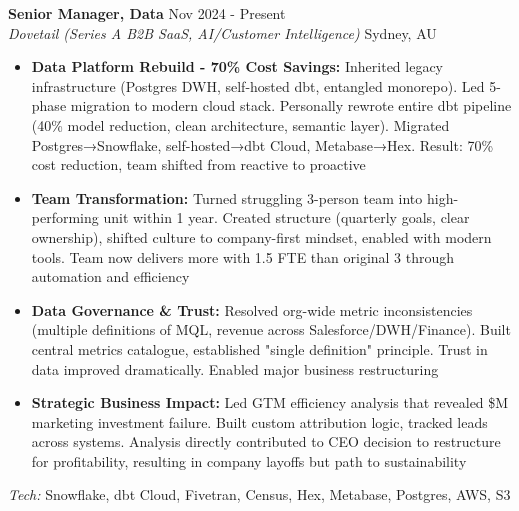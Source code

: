 \documentclass[10pt,a4paper]{article}
\newcommand{\cventry}[5]{
    \textbf{#1} \hfill {\small\color{darkgray} #2} \\
    {\color{accentcolor}\textit{#3}} \hfill {\small\color{darkgray} #4} \\
    #5
    \vspace{6pt}
}
\begin{document}
\cventry
    {Senior Manager, Data}
    {Nov 2024 - Present}
    {Dovetail (Series A B2B SaaS, AI/Customer Intelligence)}
    {Sydney, AU}
    {
    \begin{itemize}[leftmargin=*, itemsep=1pt, parsep=0pt, topsep=2pt]
        \item \textbf{Data Platform Rebuild - 70\% Cost Savings:} Inherited legacy infrastructure (Postgres DWH, self-hosted dbt, entangled monorepo). Led 5-phase migration to modern cloud stack. Personally rewrote entire dbt pipeline (40\% model reduction, clean architecture, semantic layer). Migrated Postgres→Snowflake, self-hosted→dbt Cloud, Metabase→Hex. Result: 70\% cost reduction, team shifted from reactive to proactive
        \item \textbf{Team Transformation:} Turned struggling 3-person team into high-performing unit within 1 year. Created structure (quarterly goals, clear ownership), shifted culture to company-first mindset, enabled with modern tools. Team now delivers more with 1.5 FTE than original 3 through automation and efficiency
        \item \textbf{Data Governance \& Trust:} Resolved org-wide metric inconsistencies (multiple definitions of MQL, revenue across Salesforce/DWH/Finance). Built central metrics catalogue, established "single definition" principle. Trust in data improved dramatically. Enabled major business restructuring
        \item \textbf{Strategic Business Impact:} Led GTM efficiency analysis that revealed \$M marketing investment failure. Built custom attribution logic, tracked leads across systems. Analysis directly contributed to CEO decision to restructure for profitability, resulting in company layoffs but path to sustainability
    \end{itemize}
    \textit{Tech:} Snowflake, dbt Cloud, Fivetran, Census, Hex, Metabase, Postgres, AWS, S3
    }
\end{document}
